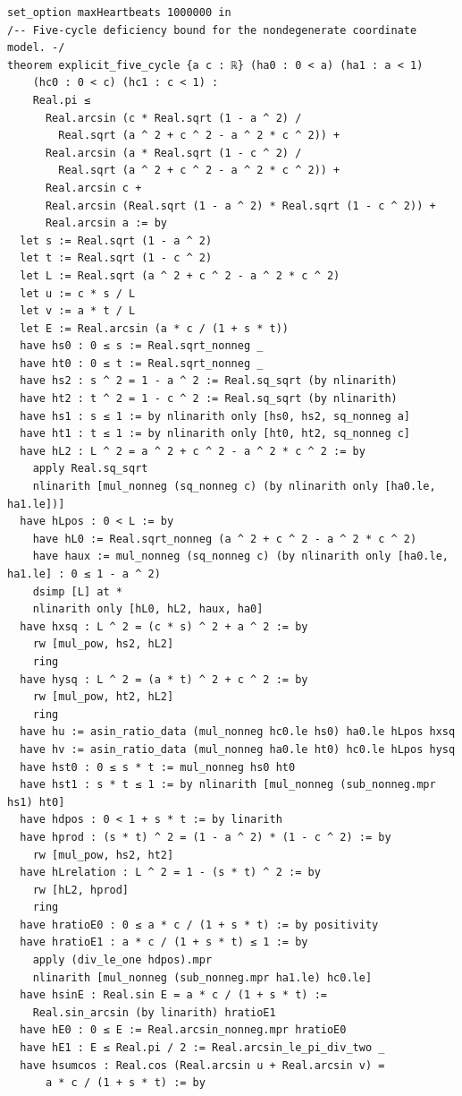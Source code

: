 \documentclass[11pt,a4paper]{article}
\begin{document}
\begin{Verbatim}[breaklines,breakanywhere,fontsize=\footnotesize]
set_option maxHeartbeats 1000000 in
/-- Five-cycle deficiency bound for the nondegenerate coordinate model. -/
theorem explicit_five_cycle {a c : ℝ} (ha0 : 0 < a) (ha1 : a < 1)
    (hc0 : 0 < c) (hc1 : c < 1) :
    Real.pi ≤
      Real.arcsin (c * Real.sqrt (1 - a ^ 2) /
        Real.sqrt (a ^ 2 + c ^ 2 - a ^ 2 * c ^ 2)) +
      Real.arcsin (a * Real.sqrt (1 - c ^ 2) /
        Real.sqrt (a ^ 2 + c ^ 2 - a ^ 2 * c ^ 2)) +
      Real.arcsin c +
      Real.arcsin (Real.sqrt (1 - a ^ 2) * Real.sqrt (1 - c ^ 2)) +
      Real.arcsin a := by
  let s := Real.sqrt (1 - a ^ 2)
  let t := Real.sqrt (1 - c ^ 2)
  let L := Real.sqrt (a ^ 2 + c ^ 2 - a ^ 2 * c ^ 2)
  let u := c * s / L
  let v := a * t / L
  let E := Real.arcsin (a * c / (1 + s * t))
  have hs0 : 0 ≤ s := Real.sqrt_nonneg _
  have ht0 : 0 ≤ t := Real.sqrt_nonneg _
  have hs2 : s ^ 2 = 1 - a ^ 2 := Real.sq_sqrt (by nlinarith)
  have ht2 : t ^ 2 = 1 - c ^ 2 := Real.sq_sqrt (by nlinarith)
  have hs1 : s ≤ 1 := by nlinarith only [hs0, hs2, sq_nonneg a]
  have ht1 : t ≤ 1 := by nlinarith only [ht0, ht2, sq_nonneg c]
  have hL2 : L ^ 2 = a ^ 2 + c ^ 2 - a ^ 2 * c ^ 2 := by
    apply Real.sq_sqrt
    nlinarith [mul_nonneg (sq_nonneg c) (by nlinarith only [ha0.le, ha1.le])]
  have hLpos : 0 < L := by
    have hL0 := Real.sqrt_nonneg (a ^ 2 + c ^ 2 - a ^ 2 * c ^ 2)
    have haux := mul_nonneg (sq_nonneg c) (by nlinarith only [ha0.le, ha1.le] : 0 ≤ 1 - a ^ 2)
    dsimp [L] at *
    nlinarith only [hL0, hL2, haux, ha0]
  have hxsq : L ^ 2 = (c * s) ^ 2 + a ^ 2 := by
    rw [mul_pow, hs2, hL2]
    ring
  have hysq : L ^ 2 = (a * t) ^ 2 + c ^ 2 := by
    rw [mul_pow, ht2, hL2]
    ring
  have hu := asin_ratio_data (mul_nonneg hc0.le hs0) ha0.le hLpos hxsq
  have hv := asin_ratio_data (mul_nonneg ha0.le ht0) hc0.le hLpos hysq
  have hst0 : 0 ≤ s * t := mul_nonneg hs0 ht0
  have hst1 : s * t ≤ 1 := by nlinarith [mul_nonneg (sub_nonneg.mpr hs1) ht0]
  have hdpos : 0 < 1 + s * t := by linarith
  have hprod : (s * t) ^ 2 = (1 - a ^ 2) * (1 - c ^ 2) := by
    rw [mul_pow, hs2, ht2]
  have hLrelation : L ^ 2 = 1 - (s * t) ^ 2 := by
    rw [hL2, hprod]
    ring
  have hratioE0 : 0 ≤ a * c / (1 + s * t) := by positivity
  have hratioE1 : a * c / (1 + s * t) ≤ 1 := by
    apply (div_le_one hdpos).mpr
    nlinarith [mul_nonneg (sub_nonneg.mpr ha1.le) hc0.le]
  have hsinE : Real.sin E = a * c / (1 + s * t) :=
    Real.sin_arcsin (by linarith) hratioE1
  have hE0 : 0 ≤ E := Real.arcsin_nonneg.mpr hratioE0
  have hE1 : E ≤ Real.pi / 2 := Real.arcsin_le_pi_div_two _
  have hsumcos : Real.cos (Real.arcsin u + Real.arcsin v) =
      a * c / (1 + s * t) := by

\end{Verbatim}
\end{document}

